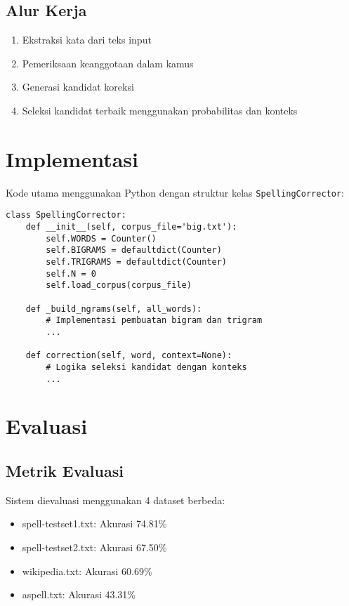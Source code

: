 \documentclass{article}
\begin{document}
\subsection{Alur Kerja}
\begin{enumerate}
    \item Ekstraksi kata dari teks input
    \item Pemeriksaan keanggotaan dalam kamus
    \item Generasi kandidat koreksi
    \item Seleksi kandidat terbaik menggunakan probabilitas dan konteks
\end{enumerate}

\section{Implementasi}
Kode utama menggunakan Python dengan struktur kelas \texttt{SpellingCorrector}:

\lstset{
    basicstyle=\ttfamily\small,
    breaklines=true,
    frame=single,
    language=Python,
    numbers=left
}

\begin{lstlisting}[caption=Klas Utama SpellingCorrector]
class SpellingCorrector:
    def __init__(self, corpus_file='big.txt'):
        self.WORDS = Counter()
        self.BIGRAMS = defaultdict(Counter)
        self.TRIGRAMS = defaultdict(Counter)
        self.N = 0
        self.load_corpus(corpus_file)
    
    def _build_ngrams(self, all_words):
        # Implementasi pembuatan bigram dan trigram
        ...
    
    def correction(self, word, context=None):
        # Logika seleksi kandidat dengan konteks
        ...
\end{lstlisting}

\section{Evaluasi}
\subsection{Metrik Evaluasi}
Sistem dievaluasi menggunakan 4 dataset berbeda:
\begin{itemize}
    \item spell-testset1.txt: Akurasi 74.81\%
    \item spell-testset2.txt: Akurasi 67.50\% 
    \item wikipedia.txt: Akurasi 60.69\%
    \item aspell.txt: Akurasi 43.31\%
\end{itemize}
\end{document}
